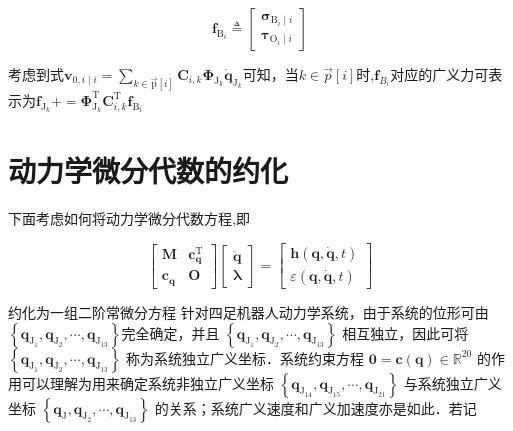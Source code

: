 \[
\boldsymbol{f}_{\mathrm{B}_{i}} \triangleq\left[\begin{array}{l}
\boldsymbol{\sigma}_{\mathrm{B}_{i} \mid i} \\
\boldsymbol{\tau}_{\mathrm{O}_{i} \mid i}
\end{array}\right]
\]

考虑到式$\boldsymbol{v}_{0, i \mid i}=\sum_{k \in \overrightarrow{\mathrm{p}}[i]} \boldsymbol{C}_{i, k} \boldsymbol{\Phi}_{\mathrm{J}_{k}} \dot{\boldsymbol{q}}_{\mathrm{J}_{k}}$可知，当$k\in \vec{p}[i]$时,$\boldsymbol{f}_{B_{i}}$对应的广义力可表示为$\boldsymbol{f}_{\mathrm{J}_{k}}+=\boldsymbol{\Phi}_{\mathrm{J}_{k}}^{\mathrm{T}} \boldsymbol{C}_{i, k}^{\mathrm{T}} \boldsymbol{f}_{\mathrm{B}_{i}}$
\section{动力学微分代数的约化}
下面考虑如何将动力学微分代数方程,即

\[
\left[\begin{array}{ll}
\boldsymbol{M} & \boldsymbol{c}_{\boldsymbol{q}}^{\mathrm{T}} \\
\boldsymbol{c}_{\boldsymbol{q}} & \boldsymbol{O}
\end{array}\right]\left[\begin{array}{l}
\ddot{\boldsymbol{q}} \\
\boldsymbol{\lambda}
\end{array}\right]=\left[\begin{array}{l}
\boldsymbol{h}(\boldsymbol{q}, \dot{\boldsymbol{q}}, t) \\
\varepsilon(\boldsymbol{q}, \dot{\boldsymbol{q}}, t)
\end{array}\right]
\]

约化为一组二阶常微分方程 针对四足机器人动力学系统，由于系统的位形可由  $\left\{\boldsymbol{q}_{\mathrm{J}_{1}}, \boldsymbol{q}_{\mathrm{J}_{2}}, \cdots, \boldsymbol{q}_{\mathrm{J}_{13}}\right\}$完全确定，并且  $\left\{\boldsymbol{q}_{\mathrm{J}_{1}}, \boldsymbol{q}_{\mathrm{J}_{2}}, \cdots, \boldsymbol{q}_{\mathrm{J}_{13}}\right\}$  相互独立，因此可将  $\left\{\boldsymbol{q}_{\mathrm{J}_{1}}, \boldsymbol{q}_{\mathrm{J}_{2}}, \cdots, \boldsymbol{q}_{\mathrm{J}_{13}}\right\}$  称为系统独立广义坐标．系统约束方程  $\mathbf{0}=\boldsymbol{c}(\boldsymbol{q}) \in \mathbb{R}^{20}$  的作用可以理解为用来确定系统非独立广义坐标  $\left\{\boldsymbol{q}_{\mathrm{J}_{14}}, \boldsymbol{q}_{\mathrm{J}_{15}}, \cdots, \boldsymbol{q}_{\mathrm{J}_{21}}\right\}$  与系统独立广义坐标  $\left\{\boldsymbol{q}_{\mathrm{J}}, \boldsymbol{q}_{\mathrm{J}_{2}}, \cdots, \boldsymbol{q}_{\mathrm{J}_{13}}\right\}$  的关系；系统广义速度和广义加速度亦是如此．若记

